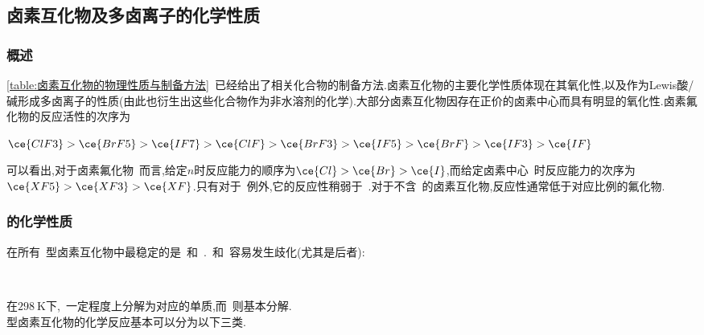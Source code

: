 \documentclass{ctexbook}
\begin{document}
\subsection{卤素互化物及多卤离子的化学性质}
\subsubsection{概述}
\autoref{table:卤素互化物的物理性质与制备方法}~已经给出了相关化合物的制备方法.卤素互化物的主要化学性质体现在其氧化性,以及作为Lewis酸/碱形成多卤离子的性质(由此也衍生出这些化合物作为非水溶剂的化学).大部分卤素互化物因存在正价的卤素中心而具有明显的氧化性.卤素氟化物的反应活性的次序为
\begin{tightcenter}
    $\ce{ClF3}>\ce{BrF5}>\ce{IF7}>\ce{ClF}>\ce{BrF3}>\ce{IF5}>\ce{BrF}>\ce{IF3}>\ce{IF}$
\end{tightcenter}
可以看出,对于卤素氟化物~而言,给定$n$时反应能力的顺序为$\ce{Cl}>\ce{Br}>\ce{I}$,而给定卤素中心~时反应能力的次序为$\ce{XF5}>\ce{XF3}>\ce{XF}$.只有对于~例外,它的反应性稍弱于~.对于不含~的卤素互化物,反应性通常低于对应比例的氟化物.
\subsubsection{的化学性质}
在所有~型卤素互化物中最稳定的是~和~.~和~容易发生歧化(尤其是后者):
\begin{tightcenter}
    \\
\end{tightcenter}
在$\SI{298}{\kelvin}$下,~一定程度上分解为对应的单质,而~则基本分解.\\
\indent {}型卤素互化物的化学反应基本可以分为以下三类.
\end{document}
